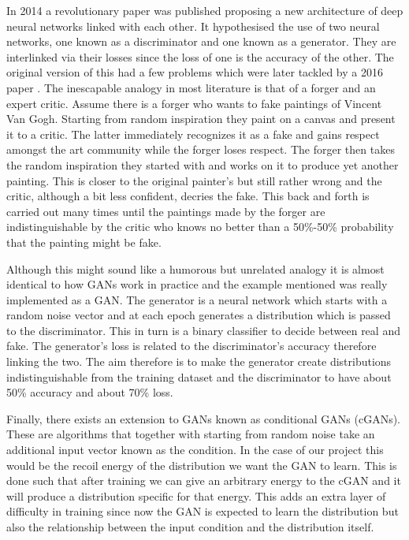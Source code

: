 \documentclass[11pt]{article} %
\begin{document}
In 2014 a revolutionary paper \cite{NIPS2014_5423} was published proposing a new architecture of deep neural networks linked with each other. It hypothesised the use of two neural networks, one known as a discriminator and one known as a generator. They are interlinked via their losses since the loss of one is the accuracy of the other. The original version of this had a few problems which were later tackled by a 2016 paper \cite{salimans2016improved}.
\newline
The inescapable analogy in most literature is that of a forger and an expert critic. Assume there is a forger who wants to fake paintings of Vincent Van Gogh. Starting from random inspiration they paint on a canvas and present it to a critic. The latter immediately recognizes it as a fake and gains respect amongst the art community while the forger loses respect. The forger then takes the random inspiration they started with and works on it to produce yet another painting. This is closer to the original painter's but still rather wrong and the critic, although a bit less confident, decries the fake. This back and forth is carried out many times until the paintings made by the forger are indistinguishable by the critic who knows no better than a 50\%-50\% probability that the painting might be fake.
\newline

Although this might sound like a humorous but unrelated analogy it is almost identical to how GANs work in practice and the example mentioned was really implemented \cite{vangogh} as a GAN. The generator is a neural network which starts with a random noise vector and at each epoch generates a distribution which is passed to the discriminator. This in turn is a binary classifier to decide between real and fake. The generator's loss is related to the discriminator's accuracy therefore linking the two. The aim therefore is to make the generator create distributions indistinguishable from the training dataset and the discriminator to have about 50\% accuracy and about 70\% loss.
\newline

Finally, there exists an extension to GANs known as conditional GANs (cGANs). These are algorithms that together with starting from random noise take an additional input vector known as the condition. In the case of our project this would be the recoil energy of the distribution we want the GAN to learn. This is done such that after training we can give an arbitrary energy to the cGAN and it will produce a distribution specific for that energy. This adds an extra layer of difficulty in training since now the GAN is expected to learn the distribution but also the relationship between the input condition and the distribution itself.
\end{document}

